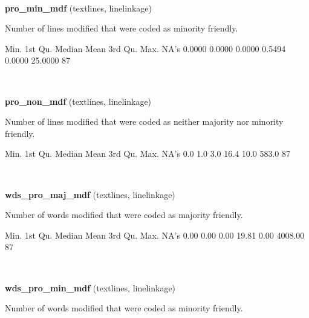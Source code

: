 \documentclass[]{article}
\newenvironment{Shaded}{\begin{snugshade}}{\end{snugshade}}
\newcommand{\StringTok}[1]{\textcolor[rgb]{0.31,0.60,0.02}{{#1}}}
\newcommand{\NormalTok}[1]{{#1}}
\begin{document}
~

\vspace{1em}

\textbf{pro\_min\_mdf} (textlines, linelinkage)

Number of lines modified that were coded as minority friendly.

\begin{Shaded}
\begin{Highlighting}[]
   \NormalTok{Min. 1st Qu.  Median    Mean 3rd Qu.    Max.    NA}\StringTok{'s }
\StringTok{ 0.0000  0.0000  0.0000  0.5494  0.0000 25.0000      87 }
\end{Highlighting}
\end{Shaded}

~

\vspace{1em}

\textbf{pro\_non\_mdf} (textlines, linelinkage)

Number of lines modified that were coded as neither majority nor
minority friendly.

\begin{Shaded}
\begin{Highlighting}[]
   \NormalTok{Min. 1st Qu.  Median    Mean 3rd Qu.    Max.    NA}\StringTok{'s }
\StringTok{    0.0     1.0     3.0    16.4    10.0   583.0      87 }
\end{Highlighting}
\end{Shaded}

~

\vspace{1em}

\textbf{wds\_pro\_maj\_mdf} (textlines, linelinkage)

Number of words modified that were coded as majority friendly.

\begin{Shaded}
\begin{Highlighting}[]
   \NormalTok{Min. 1st Qu.  Median    Mean 3rd Qu.    Max.    NA}\StringTok{'s }
\StringTok{   0.00    0.00    0.00   19.81    0.00 4008.00      87 }
\end{Highlighting}
\end{Shaded}

~

\vspace{1em}

\textbf{wds\_pro\_min\_mdf} (textlines, linelinkage)

Number of words modified that were coded as minority friendly.
\end{document}
